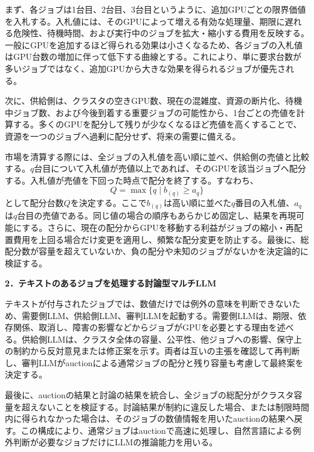 \documentclass[10pt,a4paper]{article}
\begin{document}
まず、各ジョブは1台目、2台目、3台目というように、追加GPUごとの限界価値を入札する。入札値には、そのGPUによって増える有効な処理量、期限に遅れる危険性、待機時間、および実行中のジョブを拡大・縮小する費用を反映する。一般にGPUを追加するほど得られる効果は小さくなるため、各ジョブの入札値はGPU台数の増加に伴って低下する曲線とする。これにより、単に要求台数が多いジョブではなく、追加GPUから大きな効果を得られるジョブが優先される。

次に、供給側は、クラスタの空きGPU数、現在の混雑度、資源の断片化、待機中ジョブ数、および今後到着する重要ジョブの可能性から、1台ごとの売値を計算する。多くのGPUを配分して残りが少なくなるほど売値を高くすることで、資源を一つのジョブへ過剰に配分せず、将来の需要に備える。

市場を清算する際には、全ジョブの入札値を高い順に並べ、供給側の売値と比較する。$q$台目について入札値が売値以上であれば、そのGPUを該当ジョブへ配分する。入札値が売値を下回った時点で配分を終了する。すなわち、
\[
Q=\max\{q\mid b_{(q)}\geq a_q\}
\]
として配分台数$Q$を決定する。ここで$b_{(q)}$は高い順に並べた$q$番目の入札値、$a_q$は$q$台目の売値である。同じ値の場合の順序もあらかじめ固定し、結果を再現可能にする。さらに、現在の配分からGPUを移動する利益がジョブの縮小・再配置費用を上回る場合だけ変更を適用し、頻繁な配分変更を防止する。最後に、総配分数が容量を超えていないか、負の配分や未知のジョブがないかを決定論的に検証する。

\textbf{2．テキストのあるジョブを処理する討論型マルチLLM}

テキストが付与されたジョブでは、数値だけでは例外の意味を判断できないため、需要側LLM、供給側LLM、審判LLMを起動する。需要側LLMは、期限、依存関係、取消し、障害の影響などからジョブがGPUを必要とする理由を述べる。供給側LLMは、クラスタ全体の容量、公平性、他ジョブへの影響、保守上の制約から反対意見または修正案を示す。両者は互いの主張を確認して再判断し、審判LLMがauctionによる通常ジョブの配分と残り容量も考慮して最終案を決定する。

最後に、auctionの結果と討論の結果を統合し、全ジョブの総配分がクラスタ容量を超えないことを検証する。討論結果が制約に違反した場合、または制限時間内に得られなかった場合は、そのジョブの数値情報を用いたauctionの結果へ戻す。この構成により、通常ジョブはauctionで高速に処理し、自然言語による例外判断が必要なジョブだけにLLMの推論能力を用いる。
\end{document}
